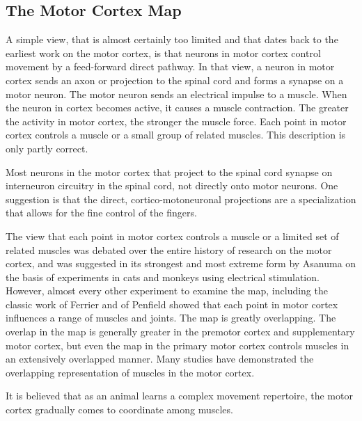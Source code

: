 \hypertarget{the-motor-cortex-map}{%
\subsection{The Motor Cortex Map}\label{the-motor-cortex-map}}

A simple view, that is almost certainly too limited and that dates back to the earliest work on the motor cortex, is that neurons in motor cortex control movement by a feed-forward direct pathway. In that view, a neuron in motor cortex sends an axon or projection to the spinal cord and forms a synapse on a motor neuron. The motor neuron sends an electrical impulse to a muscle. When the neuron in cortex becomes active, it causes a muscle contraction. The greater the activity in motor cortex, the stronger the muscle force. Each point in motor cortex controls a muscle or a small group of related muscles. This description is only partly correct.

Most neurons in the motor cortex that project to the spinal cord synapse on interneuron circuitry in the spinal cord, not directly onto motor neurons. One suggestion is that the direct, cortico-motoneuronal projections are a specialization that allows for the fine control of the fingers.

The view that each point in motor cortex controls a muscle or a limited set of related muscles was debated over the entire history of research on the motor cortex, and was suggested in its strongest and most extreme form by Asanuma on the basis of experiments in cats and monkeys using electrical stimulation. However, almost every other experiment to examine the map, including the classic work of Ferrier and of Penfield showed that each point in motor cortex influences a range of muscles and joints. The map is greatly overlapping. The overlap in the map is generally greater in the premotor cortex and supplementary motor cortex, but even the map in the primary motor cortex controls muscles in an extensively overlapped manner. Many studies have demonstrated the overlapping representation of muscles in the motor cortex.

It is believed that as an animal learns a complex movement repertoire, the motor cortex gradually comes to coordinate among muscles.

